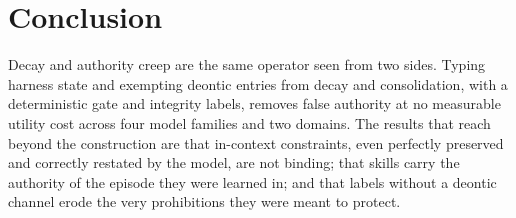 \section{Conclusion}
\label{sec:conclusion}

Decay and authority creep are the same operator seen from two sides. Typing harness state and exempting deontic entries from decay and consolidation, with a deterministic gate and integrity labels, removes false authority at no measurable utility cost across four model families and two domains. The results that reach beyond the construction are that in-context constraints, even perfectly preserved and correctly restated by the model, are not binding; that skills carry the authority of the episode they were learned in; and that labels without a deontic channel erode the very prohibitions they were meant to protect.
